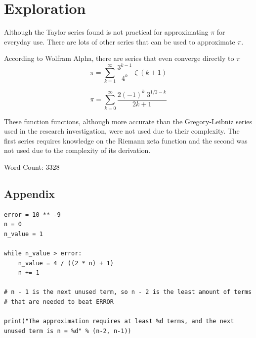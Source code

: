 \documentclass[12pt, titlepage]{article}
\begin{document}
\section{Exploration}
Although the Taylor series found is not practical for approximating \(\pi\) for everyday use. There are lots of other series that can be used to approximate \(\pi\). 

According to Wolfram Alpha, there are series that even converge directly to \(\pi\)
\begin{equation*}
    \pi = \sum_{k=1}^{\infty} \frac{3^{k-1}}{4^{k}} \; \zeta \;(k+1)
\end{equation*}

\begin{equation*}
    \pi = \sum_{k=0}^{\infty} \frac{2(-1)^{k} \; 3^{1/2-k}}{{2k+1}}
\end{equation*}

These function functions, although more accurate than the Gregory-Leibniz series used in the research investigation, were not used due to their complexity. The first series requires knowledge on the Riemann zeta function and the second was not used due to the complexity of its derivation.

Word Count: 3328

\pagebreak
\begin{appendix}
\section{Appendix}
\begin{verbatim}
error = 10 ** -9
n = 0
n_value = 1

while n_value > error:
    n_value = 4 / ((2 * n) + 1)
    n += 1

# n - 1 is the next unused term, so n - 2 is the least amount of terms 
# that are needed to beat ERROR

print("The approximation requires at least %d terms, and the next
unused term is n = %d" % (n-2, n-1))
\end{verbatim}
\end{appendix}
\end{document}
